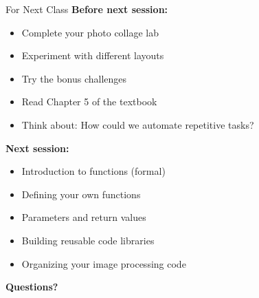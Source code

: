 \documentclass{csbeamer}
\begin{document}
\begin{frame}{For Next Class}
    \textbf{Before next session:}
    \begin{itemize}
        \item Complete your photo collage lab
        \item Experiment with different layouts
        \item Try the bonus challenges
        \item Read Chapter 5 of the textbook
        \item Think about: How could we automate repetitive tasks?
    \end{itemize}

    \vspace{1em}

    \textbf{Next session:}
    \begin{itemize}
        \item Introduction to functions (formal)
        \item Defining your own functions
        \item Parameters and return values
        \item Building reusable code libraries
        \item Organizing your image processing code
    \end{itemize}

    \vspace{1em}

    \begin{center}
        \textbf{Questions?}
    \end{center}
\end{frame}
\end{document}
